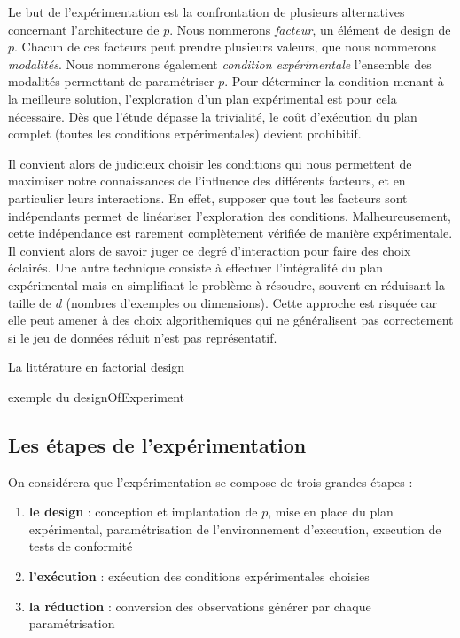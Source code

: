 

Le but de l'expérimentation est la confrontation de plusieurs alternatives concernant l'architecture de $p$. Nous nommerons \textsl{facteur}, un élément de design de $p$. Chacun de ces facteurs peut prendre plusieurs valeurs, que nous nommerons \textsl{modalités}. Nous nommerons également \textsl{condition expérimentale} l'ensemble des modalités permettant de paramétriser $p$. Pour déterminer la condition menant à la meilleure solution, l'exploration d'un plan expérimental est pour cela nécessaire. Dès que l'étude dépasse la trivialité, le coût d'exécution du plan complet (toutes les conditions expérimentales) devient prohibitif.

Il convient alors de judicieux choisir les conditions qui nous permettent de maximiser notre connaissances de l'influence des différents facteurs, et en particulier leurs interactions. En effet, supposer que tout les facteurs sont indépendants permet de linéariser l'exploration des conditions. Malheureusement, cette indépendance est rarement complètement vérifiée de manière expérimentale. Il convient alors de savoir juger ce degré d'interaction pour faire des choix éclairés. Une autre technique consiste à effectuer l'intégralité du plan expérimental mais en simplifiant le problème à résoudre, souvent en réduisant la taille de $d$ (nombres d'exemples ou dimensions). Cette approche est risquée car elle peut amener à des choix algorithemiques qui ne généralisent pas correctement si le jeu de données réduit n'est pas représentatif.

La littérature en factorial design

exemple du designOfExperiment 

\subsection{Les étapes de l'expérimentation}

On considérera que l'expérimentation se compose de trois grandes étapes :
\begin{enumerate}
  \item \textbf{le design} : conception et implantation de $p$, mise en place du plan expérimental, paramétrisation de l'environnement d'execution, execution de tests de conformité
  \item \textbf{l'exécution} : exécution des conditions expérimentales choisies
  \item \textbf{la réduction} : conversion des observations générer par chaque paramétrisation
\end{enumerate}


